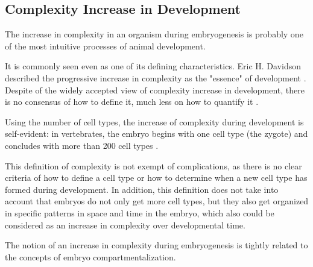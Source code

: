 \subsection{Complexity Increase in Development}

The increase in complexity in an organism during embryogenesis is probably one of the most intuitive processes of animal development.

It is commonly seen even as one of its defining characteristics.
Eric H. Davidson described the progressive increase in complexity as the "essence" of development \citep{Davidson2001}. Despite of the widely accepted view of complexity increase in development, there is no consensus of how to define it, much less on how to quantify it \citep{susan2000ontogeny}.


Using the number of cell types, the increase of complexity during development is self-evident: in vertebrates, the embryo begins with one cell type (the zygote) and concludes with more than 200 cell types \citep{Alberts1994}. 


This definition of complexity is not exempt of complications, as there is no clear criteria of how to define a cell type or how to determine when a new cell type has formed during development. 
%
In addition, this definition does not take into account that embryos do not only get more cell types, but they also get organized in specific patterns in space and time in the embryo, which also could be considered as an increase in complexity over developmental time.

The notion of an increase in complexity during embryogenesis is tightly related to the concepts of embryo compartmentalization.

